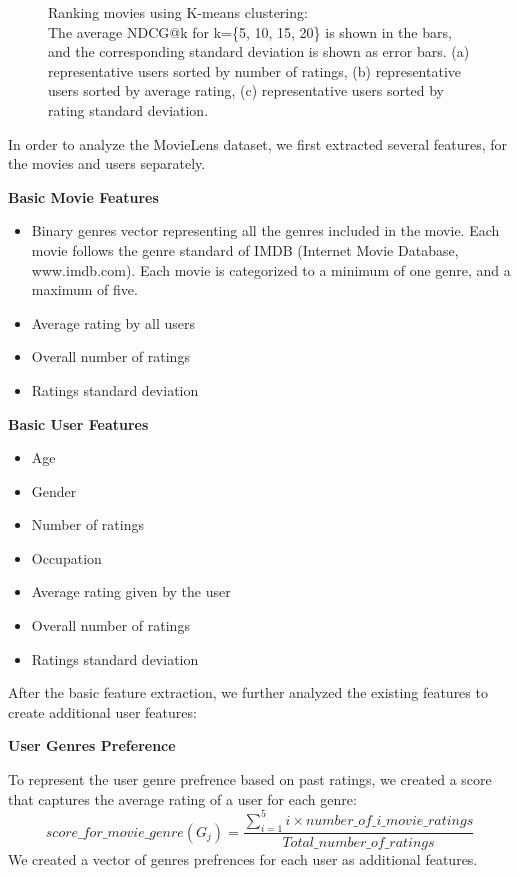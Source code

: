 \begin{figure}
{\begin{tabular}{ c c c}
\end{tabular}
}
\caption{Ranking movies using K-means clustering: 
\\The average NDCG@k for k=\{5, 10, 15, 20\} is shown in the bars, and the corresponding standard deviation is shown as error bars. (a) representative users sorted by number of ratings, (b) representative users sorted by average rating, (c) representative users sorted by rating standard deviation. }
\label{fig:ndcg}  
\end{figure}



In order to analyze the MovieLens dataset, we first extracted several features, for the movies and users separately. 

\textbf{Basic Movie Features} 
\begin{itemize}
\item Binary genres vector representing all the genres included in the movie. Each movie follows the genre standard of IMDB (Internet Movie Database, www.imdb.com). Each movie is categorized to a minimum of one genre, and a maximum of five.
\item Average rating by all users
\item Overall number of ratings
\item Ratings standard deviation
\end{itemize}

\textbf{Basic User Features} 
\begin{itemize}
\item Age
\item Gender
\item Number of ratings
\item Occupation
\item Average rating given by the user
\item Overall number of ratings
\item Ratings standard deviation
\end{itemize}

After the basic feature extraction, we further analyzed the existing features to create additional user features:

\textbf{User Genres Preference}

To represent the user genre prefrence based on past ratings, we created a score that captures the average rating of a user for each genre: 
\begin{equation} score\_for\_movie\_genre(G_j) = \frac{\sum^5_{i=1}{i\times number\_of\_i\_movie\_ratings}}{Total\_number\_of\_ratings} 
\end{equation}
We created a vector of genres prefrences for each user as additional features.

